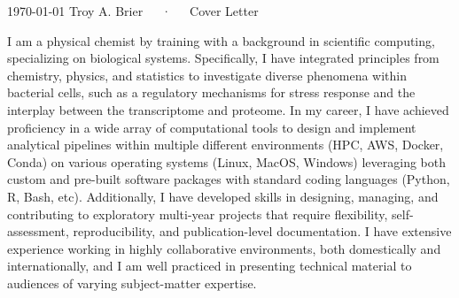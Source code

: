 \documentclass[11pt, a4paper]{awesome-cv}
\begin{document}
	
	\makecvheader[R]
	
	
	\makecvfooter
	{\today}
	{Troy A. Brier~~~·~~~Cover Letter}
	{}
	
	\makelettertitle
	\vspace{-10pt}
	\begin{cvletter}
		I am a physical chemist by training with a background in scientific computing, specializing on biological systems.
		Specifically, I have integrated principles from chemistry, physics, and statistics to investigate diverse phenomena within bacterial cells, such as a regulatory mechanisms for stress response and the interplay between the transcriptome and proteome.	
		In my career, I have achieved proficiency in a wide array of computational tools to design and implement analytical pipelines within multiple different environments (HPC, AWS, Docker, Conda) on various operating systems (Linux, MacOS, Windows) leveraging both custom and pre-built software packages with standard coding languages (Python, R, Bash, etc).
		Additionally, I have developed skills in designing, managing, and contributing to exploratory multi-year projects that require flexibility, self-assessment, reproducibility, and publication-level documentation.
		I have extensive experience working in highly collaborative environments, both domestically and internationally, and I am well practiced in presenting technical material to audiences of varying subject-matter expertise.
		

\end{cvletter}
\end{document}
